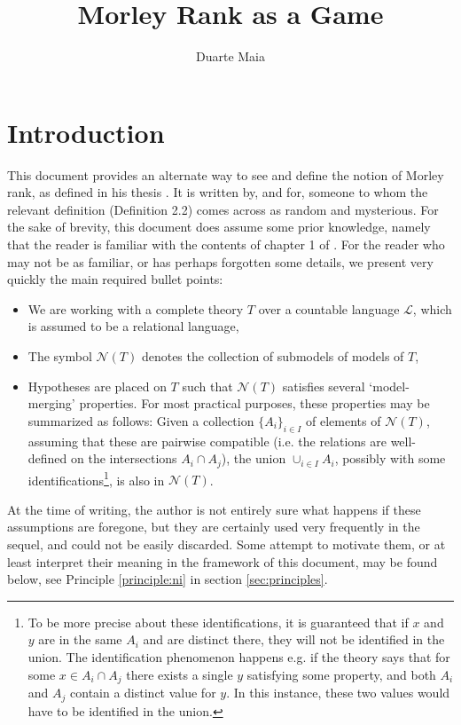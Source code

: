 \documentclass{article}
\title{Morley Rank as a Game}
\author{Duarte Maia}
\theoremstyle{nonumberplain}
\newcommand{\Lang}{\mathcal{L}}
\newcommand{\calN}{\mathcal{N}}
\begin{document}
\maketitle


\section{Introduction}

This document provides an alternate way to see and define the notion of Morley rank, as defined in his thesis \cite{morley}. It is written by, and for, someone to whom the relevant definition (Definition 2.2) comes across as random and mysterious. For the sake of brevity, this document does assume some prior knowledge, namely that the reader is familiar with the contents of chapter 1 of \cite{morley}. For the reader who may not be as familiar, or has perhaps forgotten some details, we present very quickly the main required bullet points:
\begin{itemize}
\item We are working with a complete theory $T$ over a countable language $\Lang$, which is assumed to be a relational language,
\item The symbol $\calN(T)$ denotes the collection of submodels of models of $T$,
\item Hypotheses are placed on $T$ such that $\calN(T)$ satisfies several `model-merging' properties. For most practical purposes, these properties may be summarized as follows: Given a collection $\{A_i\}_{i \in I}$ of elements of $\calN(T)$, assuming that these are pairwise compatible (i.e. the relations are well-defined on the intersections $A_i \cap A_j$), the union $\cup_{i \in I} A_i$, possibly with some identifications\footnote{To be more precise about these identifications, it is guaranteed that if $x$ and $y$ are in the same $A_i$ and are distinct there, they will not be identified in the union. The identification phenomenon happens e.g. if the theory says that for some $x \in A_i \cap A_j$ there exists a single $y$ satisfying some property, and both $A_i$ and $A_j$ contain a distinct value for $y$. In this instance, these two values would have to be identified in the union.}, is also in $\calN(T)$.
\end{itemize}

At the time of writing, the author is not entirely sure what happens if these assumptions are foregone, but they are certainly used very frequently in the sequel, and could not be easily discarded. Some attempt to motivate them, or at least interpret their meaning in the framework of this document, may be found below, see Principle \ref{principle:ni} in section \ref{sec:principles}.
\end{document}
